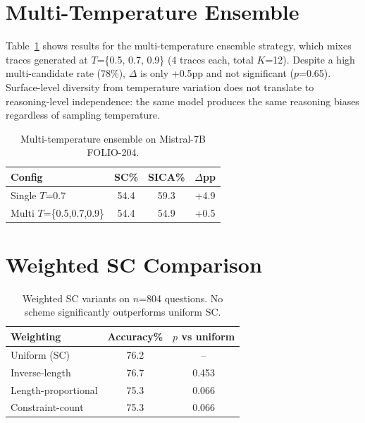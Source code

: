 \documentclass[11pt,a4paper]{article}
\begin{document}
%
%

\appendix

\section{Multi-Temperature Ensemble}
\label{app:multitemp}

Table~\ref{tab:multitemp} shows results for the multi-temperature ensemble strategy, which mixes traces generated at $T$=\{0.5, 0.7, 0.9\} (4 traces each, total $K$=12). Despite a high multi-candidate rate (78\%), $\Delta$ is only +0.5pp and not significant ($p$=0.65). Surface-level diversity from temperature variation does not translate to reasoning-level independence: the same model produces the same reasoning biases regardless of sampling temperature.

\begin{table}[h]
\centering
\small
\caption{Multi-temperature ensemble on Mistral-7B FOLIO-204.}
\label{tab:multitemp}
\begin{tabular}{lccc}
\toprule
\textbf{Config} & \textbf{SC\%} & \textbf{SICA\%} & \textbf{$\Delta$pp} \\
\midrule
Single $T$=0.7 & 54.4 & 59.3 & +4.9 \\
Multi $T$=\{0.5,0.7,0.9\} & 54.4 & 54.9 & +0.5 \\
\bottomrule
\end{tabular}
\end{table}

\section{Weighted SC Comparison}
\label{app:weighted}

\begin{table}[h]
\centering
\small
\caption{Weighted SC variants on $n$=804 questions. No scheme significantly outperforms uniform SC.}
\label{tab:weighted}
\begin{tabular}{lcc}
\toprule
\textbf{Weighting} & \textbf{Accuracy\%} & \textbf{$p$ vs uniform} \\
\midrule
Uniform (SC) & 76.2 & -- \\
Inverse-length & 76.7 & 0.453 \\
Length-proportional & 75.3 & 0.066 \\
Constraint-count & 75.3 & 0.066 \\
\bottomrule
\end{tabular}
\end{table}
\end{document}
